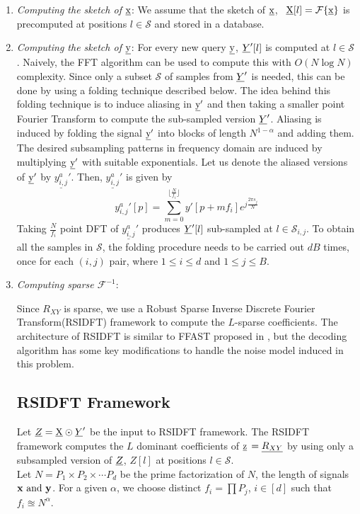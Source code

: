 \begin{enumerate}
	\item[\RNum{1}] \textit{Computing the sketch of $\underline{\mathrm{x}}$}: 
	 We assume that the sketch of $\underline{\mathrm{x}}$, \ $ \underline{\mathrm{X}}[l] = \mathcal{F}\{\underline{\mathrm{x}}\}$ is precomputed at positions $l \in \mathcal{S}$ and stored in a database.  
	\item[\RNum{2}] \textit{Computing the sketch of $\underline{\mathrm{y}}$}:
	 For every new query $\underline{\mathrm{y}}$, $ \underline{Y}'[l]$ is computed at $l \in \mathcal{S}$. Naively, the FFT algorithm can be used to compute this with $O(N \log N)$ complexity. Since only a subset $\mathcal{S}$ of samples from $\underline{Y}'$ is needed, this can be done by using a folding technique described below. 
	  The idea behind this folding technique is to induce aliasing in $\underline{\mathrm{y}}'$ and then taking a smaller point Fourier Transform to compute the sub-sampled version $\underline{Y}'$. Aliasing is induced by folding the signal $\underline{\mathrm{y}}'$ into blocks of length $N^{1-\alpha}$ and adding them. The desired subsampling patterns in frequency domain are induced by multiplying $\underline{\mathrm{y}}'$ with suitable exponentials. Let us denote the aliased versions of $\underline{\mathrm{y}}'$ by $\underline{y^{a}_{i,j}}'$. Then, $\underline{y^{a}_{i,j}}'$ is given by
	  \begin{equation}
	  	{y^{a}_{i,j}}'[p] = \sum \limits_{m = 0}^{\lfloor{\frac{N}{f_i}}\rfloor} y'[p + mf_i] e^{j \frac{2 \pi s_j}{N} } 
	  \end{equation}
	  Taking $\frac{N}{f_i}$ point DFT of $\underline{y^{a}_{i,j}}'$ produces $\underline{Y}'[l]$ sub-sampled at $l \in \mathcal{S}_{i,j}$. To obtain all the samples in $\mathcal{S}$, the folding procedure needs to be carried out $dB$ times, once for each $(i,j)$ pair, where $1 \leq i \leq d $ and  $1 \leq j \leq B $.  
	       
	\item[\RNum{3}] \textit{Computing sparse $\mathcal{F}^{-1}$}: 
	
	 Since $R_{XY}$ is sparse, we use a Robust Sparse Inverse  Discrete Fourier Transform(RSIDFT) framework to compute the $L$-sparse coefficients. The architecture of RSIDFT is similar to FFAST proposed in \cite{pawar2014robust}, but the decoding algorithm has some key modifications to handle the noise model induced in this problem.
	 
	 
	 \subsection{RSIDFT Framework} 	\label{sec:RSIDFT}
	
	  Let $ \underline{Z}  =  \underline{\mathrm{X}} \odot \underline{Y}'$ be the input to RSIDFT framework. The RSIDFT framework computes the $L$ dominant coefficients of $\underline{\mathrm{z}}$ $= {\underline{R_{XY}}}$ by using only a subsampled version of $\underline{Z}$, $Z[l]$ at positions $l \in \mathcal{S}$.\\
	  Let $N = P_1 \times P_2 \times \cdots P_d$ be the prime factorization of $N$, the length of signals $\bf x \ \text{and} \ y$. For a given $\alpha$, we choose distinct $f_i = \prod P_j$, $i \in [d]$ such that $f_i \approxeq N^{\alpha} $. 
	 

\end{enumerate}
